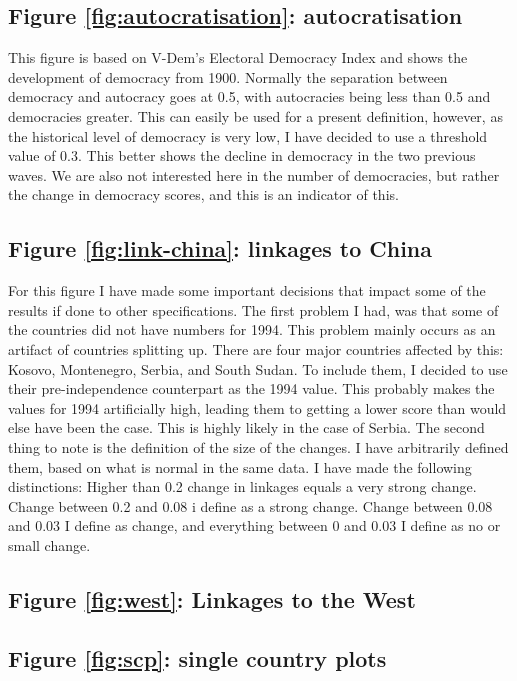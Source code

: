 \subsection{Figure \ref{fig:autocratisation}: autocratisation}
This figure is based on V-Dem's Electoral Democracy Index and shows the development of democracy from 1900. Normally the separation between democracy and autocracy goes at 0.5, with autocracies being less than 0.5 and democracies greater. This can easily be used for a present definition, however, as the historical level of democracy is very low, I have decided to use a threshold value of 0.3. This better shows the decline in democracy in the two previous waves. We are also not interested here in the number of democracies, but rather the change in democracy scores, and this is an indicator of this.

\subsection{Figure \ref{fig:link-china}: linkages to China}
For this figure I have made some important decisions that impact some of the results if done to other specifications. The first problem I had, was that some of the countries did not have numbers for 1994. This problem mainly occurs as an artifact of countries splitting up. There are four major countries affected by this: Kosovo, Montenegro, Serbia, and South Sudan. To include them, I decided to use their pre-independence counterpart as the 1994 value. This probably makes the values for 1994 artificially high, leading them to getting a lower score than would else have been the case. This is highly likely in the case of Serbia. The second thing to note is the definition of the size of the changes. I have arbitrarily defined them, based on what is normal in the same data. I have made the following distinctions: Higher than 0.2 change in linkages equals a very strong change. Change between 0.2 and 0.08 i define as a strong change. Change between 0.08 and 0.03 I define as change, and everything between 0 and 0.03 I define as no or small change. 

\subsection{Figure \ref{fig:west}: Linkages to the West}

\subsection{Figure \ref{fig:scp}: single country plots}